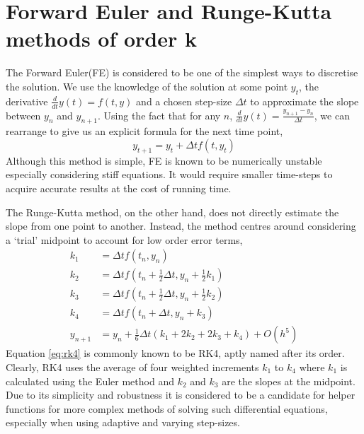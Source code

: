\documentclass{report}
\begin{document}
\section{Forward Euler and Runge-Kutta methods of order k}
The Forward Euler(FE) is considered to be one of the simplest ways to discretise the solution. We use the knowledge of the solution at some point $y_t$, the derivative $\frac{d}{dt}y(t)=f(t,y)$ and a chosen step-size $\Delta t$ to approximate the slope between $y_n$ and $y_{n+1}$. Using the fact that for any $n$, $\frac{d}{dt}y(t) = \frac{y_{n+1} - y_n}{\Delta t}$, we can rearrange to give us an explicit formula for the next time point,
\begin{equation}
    y_{t+1} = y_t + \Delta t f(t,y_t)
    \label{eq:euler}
\end{equation}
Although this method is simple, FE is known to be numerically unstable especially considering stiff equations. It would require smaller time-steps to acquire accurate results at the cost of running time. 

The Runge-Kutta method, on the other hand, does not directly estimate the slope from one point to another. Instead, the method centres around considering a `trial' midpoint to account for low order error terms,
\begin{align}
	k_1 &= \Delta t f(t_n,y_n) \nonumber \\
    k_2 &= \Delta t f(t_n + \frac{1}{2}\Delta t, y_n + \frac{1}{2}k_1) \nonumber\\
    k_3 &= \Delta t f(t_n + \frac{1}{2}\Delta t, y_n + \frac{1}{2}k_2) \nonumber \\
    k_4 &= \Delta t f(t_n + \Delta t, y_n + k_3) \nonumber \\
    y_{n+1} &= y_n +\frac{1}{6}\Delta t(k_1 + 2k_2 + 2k_3 +k_4) + O(h^5) 
    \label{eq:rk4}
\end{align}
Equation \eqref{eq:rk4} is commonly known to be RK4, aptly named after its order. Clearly, RK4 uses the average of four weighted increments $k_1$ to $k_4$ where $k_1$ is calculated using the Euler method and $k_2$ and $k_3$ are the slopes at the midpoint. Due to its simplicity and robustness it is considered to be a candidate for helper functions for more complex methods of solving such differential equations, especially when using adaptive and varying step-sizes. 
\end{document}
